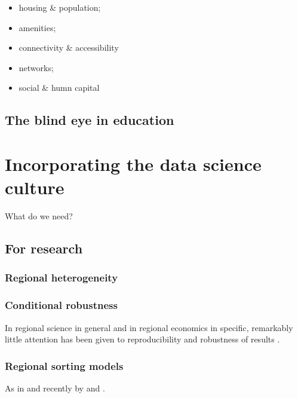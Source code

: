 \documentclass[fleqn,10pt]{SelfArx} %
\begin{document}
\begin{itemize}
	\item housing \& population; 
	\item amenities;
	\item connectivity \& accessibility
	\item networks;
	\item social \& humn capital
\end{itemize}

\subsection{The blind eye in education}


\section{Incorporating the data science culture\label{agenda}}

What do we need?

\subsection{For research}

\subsubsection{Regional heterogeneity}

\citep{Thissen2016, Graaff2012, DeGraaff2012}

\subsubsection{Conditional robustness}

In regional science in general and in regional economics in specific, remarkably little attention has been given to reproducibility and robustness of results \citep[with some exceptions as, amongst some others, by][]{Rey:2014cl,arribas2015woow, Arribas2016}.

\subsubsection{Regional sorting models}

As in \citet{Bayer2004, Bayer2007a} and recently by \citet{Wang2016} and \citet{Bernasco2016}.
\end{document}
